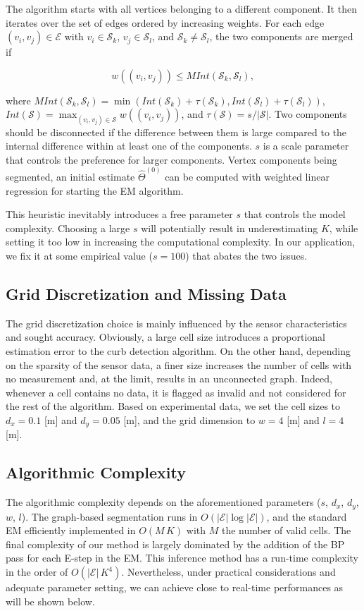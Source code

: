 The algorithm starts with all vertices belonging to a different component. It
then iterates over the set of edges ordered by increasing weights. For each
edge $(v_i,v_j)\in\mathcal{E}$ with $v_i\in\mathcal{S}_k$,
$v_j\in\mathcal{S}_l$, and $\mathcal{S}_k\neq\mathcal{S}_l$, the two components
are merged if

\begin{equation}
\label{eqn:merge}
w((v_i,v_j))\leq MInt(\mathcal{S}_k, \mathcal{S}_l),
\end{equation}

where $MInt(\mathcal{S}_k,\mathcal{S}_l)=\min(Int(\mathcal{S}_k)+
\tau(\mathcal{S}_k),Int(\mathcal{S}_l)+\tau(\mathcal{S}_l))$,
$Int(\mathcal{S})=\max_{(v_i,v_j)\in\mathcal{S}} w((v_i,v_j))$, and
$\tau(\mathcal{S})=s/|\mathcal{S}|$. Two components should be disconnected if
the difference between them is large compared to the internal difference within
at least one of the components. $s$ is a scale parameter that controls the
preference for larger components. Vertex components being segmented, an initial
estimate $\hat{\Theta}^{(0)}$ can be computed with weighted linear regression
for starting the EM algorithm.

This heuristic inevitably introduces a free parameter $s$ that controls the
model complexity. Choosing a large $s$ will potentially result in
underestimating $K$, while setting it too low in increasing the computational
complexity. In our application, we fix it at some empirical value ($s=100$) that
abates the two issues.

\subsection{Grid Discretization and Missing Data}

The grid discretization choice is mainly influenced by the sensor
characteristics and sought accuracy. Obviously, a large cell size introduces
a proportional estimation error to the curb detection algorithm. On the other
hand, depending on the sparsity of the sensor data, a finer size increases the
number of cells with no measurement and, at the limit, results in an unconnected
graph. Indeed, whenever a cell contains no data, it is flagged as invalid and
not considered for the rest of the algorithm. Based on experimental data, we
set the cell sizes to $d_x=0.1$ [m] and $d_y=0.05$ [m], and the grid dimension
to $w=4$ [m] and $l=4$ [m].

\subsection{Algorithmic Complexity}

The algorithmic complexity depends on the aforementioned parameters ($s$, $d_x$,
$d_y$, $w$, $l$). The graph-based segmentation runs in
$O(|\mathcal{E}|\log|\mathcal{E}|)$, and the standard EM efficiently implemented
in $O(M\,K)$ with $M$ the number of valid cells. The final complexity of our
method is largely dominated by the addition of the BP pass for each E-step in
the EM. This inference method has a run-time complexity in the order of
$O(|\mathcal{E}|\,K^4)$. Nevertheless, under practical considerations and
adequate parameter setting, we can achieve close to real-time performances as
will be shown below.
